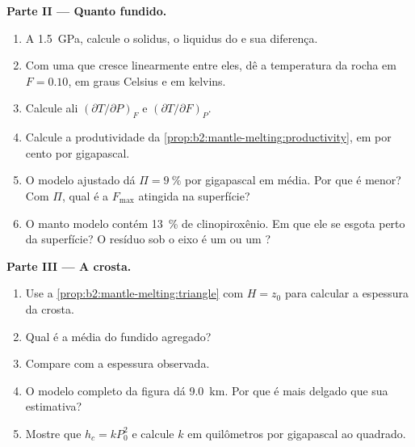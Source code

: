 \begin{problem}
\noindent\textbf{Parte II --- Quanto fundido.}
\begin{enumerate}[resume]
\item A \qty{1.5}{GPa}, calcule o solidus, o liquidus do  e sua
diferença.
\item Com uma  que cresce linearmente entre eles, dê a temperatura da
rocha em $F = 0.10$, em graus Celsius e em kelvins.
\item Calcule ali $(\partial T/\partial P)_F$ e $(\partial T/\partial F)_P$.
\item Calcule a produtividade da \cref{prop:b2:mantle-melting:productivity}, em
por cento por gigapascal.
\item O modelo ajustado dá $\Pi = \qty{9}{\percent}$ por gigapascal em média.
Por que é menor? Com $\Pi$, qual é a  $F_{\max}$ atingida na
superfície?
\item O manto modelo contém \qty{13}{\percent} de clinopiroxênio. Em que 
ele se esgota perto da superfície? O resíduo sob o eixo é um
 ou um ?
\end{enumerate}

\noindent\textbf{Parte III --- A crosta.}
\begin{enumerate}[resume]
\item Use a \cref{prop:b2:mantle-melting:triangle} com $H = z_0$ para calcular a
espessura da crosta.
\item Qual é a  média do fundido agregado?
\item Compare com a espessura observada.
\item O modelo completo da figura dá \qty{9.0}{km}. Por que é mais delgado que
sua estimativa?
\item Mostre que $h_c = k P_0^2$ e calcule $k$ em quilômetros por gigapascal
ao quadrado.
\end{enumerate}


\end{problem}
